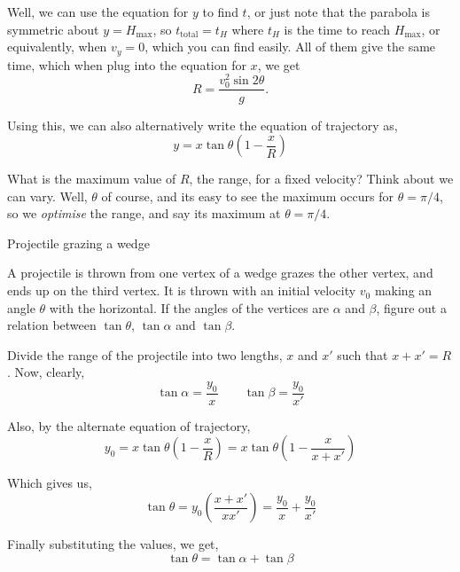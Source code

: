     Well, we can use the equation for $y$ to
    find $t$, or just note that the parabola is symmetric about $y = H_{\text{max}}$, so $t_{\text{total}} = t_H$ where $t_H$ is the time to reach $H_{\text{max}}$, or 
    equivalently, when $v_y = 0$, which you can find easily. All of them give the same time, which when plug into the equation for $x$, we get
    \begin{equation}
        \boxed{R = \frac{v_0^2\sin2\theta}{g}}.    
    \end{equation}

    Using this, we can also alternatively write the equation of trajectory as,
    \begin{equation}
        y = x\tan\theta\left(1 - \frac{x}{R}\right)
    \end{equation}

    What is the maximum value of $R$, the range, for a fixed velocity? Think about we can vary. Well, $\theta$ of course, and its easy to see the maximum occurs for $\theta = \pi/4$,
    so we \textit{optimise} the range, and say its maximum at $\theta = \pi/4$. 

    \begin{marginfigure}
        \vspace{10em}
        \hspace*{-4em}
        \caption{Projectile grazing a wedge}
    \end{marginfigure}

    \begin{example}
        A projectile is thrown from one vertex of a wedge grazes the other vertex, and ends up on the third vertex. 
        It is thrown with an initial velocity $v_0$ making an angle $\theta$ with the horizontal. 
        If the angles of the vertices are $\alpha$ and $\beta$, figure out a relation 
        between $\tan \theta$, $\tan \alpha$ and $\tan \beta$.

        \begin{soln}
            Divide the range of the projectile into two lengths, $x$ and $x'$ such that $x + x' = R$. Now, clearly,
            \[
            \tan \alpha = \frac{y_0}{x} \qquad \tan \beta = \frac{y_0}{x'}
            \]
            
            Also, by the alternate equation of trajectory,
            \[
            y_0 = x \tan \theta \left(1 - \frac{x}{R} \right) = x \tan \theta \left(1 - \frac{x}{x + x'} \right)
            \]
            
            Which gives us,
            \[
            \tan \theta = y_0 \left( \frac{x + x'}{x x'} \right) = \frac{y_0}{x} + \frac{y_0}{x'}
            \]
            
            Finally substituting the values, we get,
            \[
            \tan \theta = \tan \alpha + \tan \beta
            \]
        \end{soln}

    \end{example}
    
